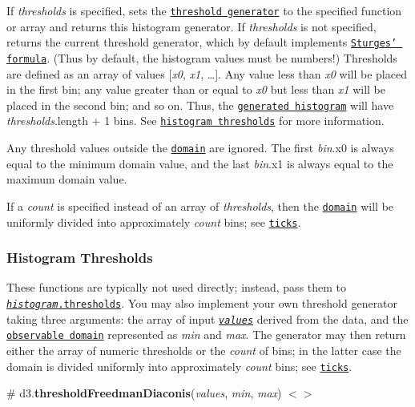 If {\itshape thresholds} is specified, sets the \href{#histogram-thresholds}{\tt threshold generator} to the specified function or array and returns this histogram generator. If {\itshape thresholds} is not specified, returns the current threshold generator, which by default implements \href{#thresholdSturges}{\tt Sturges’ formula}. (Thus by default, the histogram values must be numbers!) Thresholds are defined as an array of values \mbox{[}{\itshape x0}, {\itshape x1}, …\mbox{]}. Any value less than {\itshape x0} will be placed in the first bin; any value greater than or equal to {\itshape x0} but less than {\itshape x1} will be placed in the second bin; and so on. Thus, the \href{#_histogram}{\tt generated histogram} will have {\itshape thresholds}.length + 1 bins. See \href{#histogram-thresholds}{\tt histogram thresholds} for more information.

Any threshold values outside the \href{#histogram_domain}{\tt domain} are ignored. The first {\itshape bin}.x0 is always equal to the minimum domain value, and the last {\itshape bin}.x1 is always equal to the maximum domain value.

If a {\itshape count} is specified instead of an array of {\itshape thresholds}, then the \href{#histogram_domain}{\tt domain} will be uniformly divided into approximately {\itshape count} bins; see \href{#ticks}{\tt ticks}.

\subsubsection*{Histogram Thresholds}

These functions are typically not used directly; instead, pass them to \href{#histogram_thresholds}{\tt {\itshape histogram}.thresholds}. You may also implement your own threshold generator taking three arguments\+: the array of input \href{#histogram_value}{\tt {\itshape values}} derived from the data, and the \href{#histogram_domain}{\tt observable domain} represented as {\itshape min} and {\itshape max}. The generator may then return either the array of numeric thresholds or the {\itshape count} of bins; in the latter case the domain is divided uniformly into approximately {\itshape count} bins; see \href{#ticks}{\tt ticks}.

\label{_thresholdFreedmanDiaconis}%
\# d3.{\bfseries threshold\+Freedman\+Diaconis}({\itshape values}, {\itshape min}, {\itshape max}) \href{https://github.com/d3/d3-array/blob/master/src/threshold/freedmanDiaconis.js}{\tt $<$$>$}

